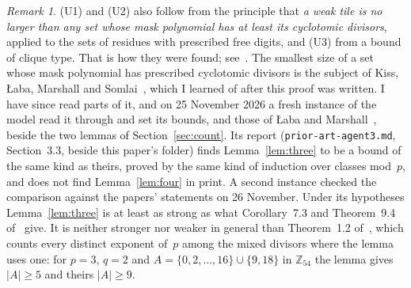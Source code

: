 \documentclass[11pt,a4paper]{amsart}
\theoremstyle{definition}
\theoremstyle{remark}
\newtheorem{remark}[theorem]{Remark}
\newcommand{\Z}{\mathbb{Z}}
\begin{document}
\begin{remark}
(U1) and (U2) also follow from the principle that \emph{a weak tile is no larger than any set whose mask
polynomial has at least its cyclotomic divisors}, applied to the sets of residues with prescribed free digits,
and (U3) from a bound of clique type. That is how they were found; see~\cite{Ynote}.
The smallest size of a set whose mask polynomial has prescribed cyclotomic divisors is the subject of Kiss,
{\L}aba, Marshall and Somlai~\cite{KLaMS}, which I learned of after this proof was written. I have since read
parts of it, and on 25 November 2026 a fresh instance of the model read it through and set its bounds, and those
of {\L}aba and Marshall~\cite{LaM}, beside the two lemmas of Section~\ref{sec:count}. Its report
(\texttt{prior-art-agent3.md}, Section~3.3, beside this paper's folder) finds Lemma~\ref{lem:three} to be a
bound of the same kind as theirs, proved by the same kind of induction over classes mod~$p$, and does
not find Lemma~\ref{lem:four} in print. A second instance checked the comparison against the papers'
statements on 26 November. Under its hypotheses Lemma~\ref{lem:three} is at least as strong as what
Corollary~7.3 and Theorem~9.4 of~\cite{KLaMS} give. It is neither stronger nor weaker in general than
Theorem~1.2 of~\cite{LaM}, which counts every distinct exponent of~$p$ among the mixed divisors where the lemma
uses one: for $p=3$, $q=2$ and $A=\{0,2,\dots,16\}\cup\{9,18\}$ in $\Z_{54}$ the lemma gives $|A|\ge 5$ and
theirs $|A|\ge 9$.


\end{remark}
\end{document}
